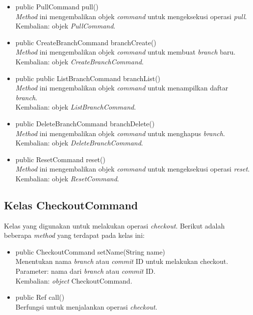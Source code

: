 \begin{itemize}
\item public PullCommand pull()\\
\textit{Method} ini mengembalikan objek \textit{command} untuk mengeksekusi operasi \textit{pull}.\\
Kembalian: objek \textit{PullCommand}.

\item public CreateBranchCommand branchCreate()\\
\textit{Method} ini mengembalikan objek \textit{command} untuk membuat \textit{branch} baru.\\
Kembalian: objek \textit{CreateBranchCommand}.

\item public public ListBranchCommand branchList()\\
\textit{Method} ini mengembalikan objek \textit{command} untuk menampilkan daftar \textit{branch}.\\
Kembalian: objek \textit{ListBranchCommand}.

\item public DeleteBranchCommand branchDelete()\\
\textit{Method} ini mengembalikan objek \textit{command} untuk menghapus \textit{branch}.\\
Kembalian: objek \textit{DeleteBranchCommand}.

\item public ResetCommand reset()\\
\textit{Method} ini mengembalikan objek \textit{command} untuk mengeksekusi operasi \textit{reset}.\\
Kembalian: objek \textit{ResetCommand}.
\end{itemize}

\subsection{Kelas CheckoutCommand}
\label{subsec:checkoutcommand}
Kelas yang digunakan untuk melakukan operasi \textit{checkout}.
Berikut adalah beberapa \textit{method} yang terdapat pada kelas ini:
\begin{itemize}
\item public CheckoutCommand setName(String name)\\
Menentukan nama  \textit{branch} atau \textit{commit} ID untuk melakukan checkout.\\
Parameter: nama dari \textit{branch} atau \textit{commit} ID.\\
Kembalian: \textit{object} CheckoutCommand.
\item public Ref call()\\
Berfungsi untuk menjalankan operasi \textit{checkout}.
\end{itemize}

